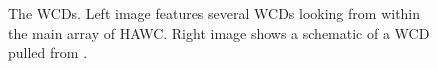 \begin{figure}
    \caption{The WCDs. Left image features several WCDs looking from within the main array of HAWC. Right image shows a schematic of a WCD pulled from \cite{HAWC_NIM}.}
    \label{fig:WCD_schematic}
\end{figure}
